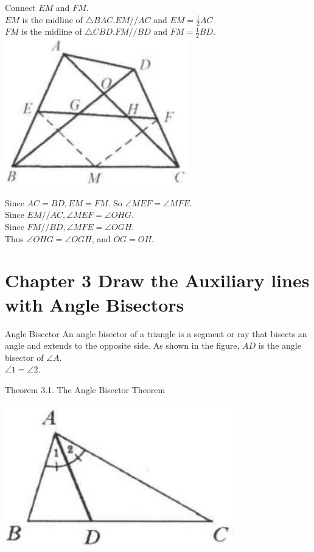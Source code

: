 \documentclass{article}
\begin{document}
Connect \(E M\) and \(F M\).\\
\(E M\) is the midline of \(\triangle B A C . E M / / A C\) and \(E M=\frac{1}{2} A C\)\\
\(F M\) is the midline of \(\triangle C B D . F M / / B D\) and \(F M=\frac{1}{2} B D\).\\
\centering
\includegraphics[width=\textwidth]{images/052.jpg}

Since \(A C=B D, E M=F M\). So \(\angle M E F=\angle M F E\).\\
Since \(E M / / A C, \angle M E F=\angle O H G\).\\
Since \(F M / / B D, \angle M F E=\angle O G H\).\\
Thus \(\angle O H G=\angle O G H\), and \(O G=O H\).

\section*{Chapter 3 Draw the Auxiliary lines with Angle Bisectors}
Angle Bisector
An angle bisector of a triangle is a segment or ray that bisects an angle and extends to the opposite side. As shown in the figure, \(A D\) is the angle bisector of \(\angle A\).\\
\(\angle 1=\angle 2\).

Theorem 3.1. The Angle Bisector Theorem
\begin{center}
\includegraphics[width=\textwidth]{images/053.jpg}
\end{center}
\end{document}
